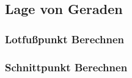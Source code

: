 \subsection{Lage von Geraden}
\subsubsection{Lotfußpunkt Berechnen}
\subsubsection{Schnittpunkt Berechnen}
